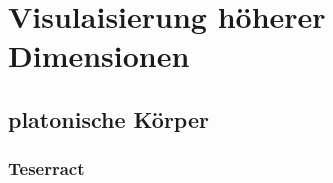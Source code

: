 \chapter{Visulaisierung höherer Dimensionen}

\label{sec:Visualisierung}

\section{platonische Körper}
\subsection{Teserract}